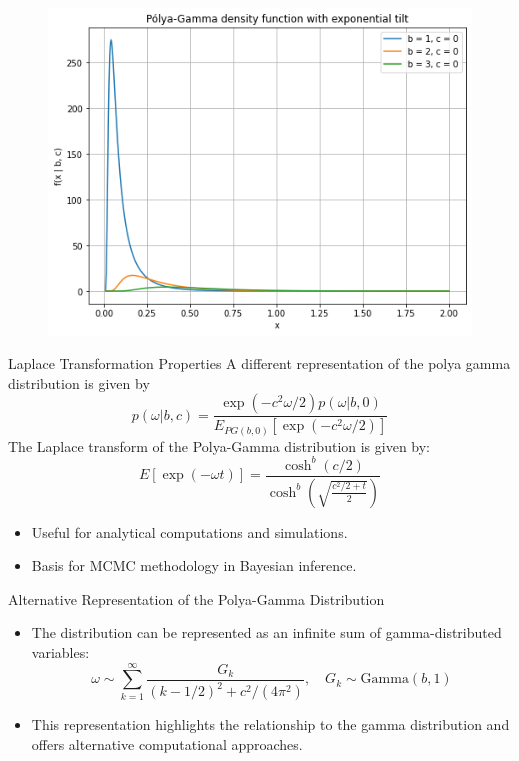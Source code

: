 \documentclass{beamer}
\begin{document}
	\begin{frame}
		\begin{figure}
			\centering
			\includegraphics[width=0.95\linewidth]{polya_b1c0}
			\label{fig:polyab1c0}
		\end{figure}
	\end{frame}
	
	
	\begin{frame}{Laplace Transformation Properties}
		A different representation of the polya gamma distribution is given by
				\begin{equation}
			p(\omega | b, c) = \frac{\exp(-c^2 \omega /2) p(\omega | b, 0)}{E_{PG(b,0)}[\exp(-c^2 \omega /2)]}
		\end{equation}
		The Laplace transform of the Polya-Gamma distribution is given by:
		\begin{equation}
			E[\exp(-\omega t)] =\frac{ \cosh^{b}(c/2)}{\cosh^{b}(\sqrt{\frac{c^2/2+t}{2}})}
		\end{equation}
		\begin{itemize}
			\item Useful for analytical computations and simulations.
			\item Basis for MCMC methodology in Bayesian inference.
		\end{itemize}
	\end{frame}
	




	\begin{frame}{Alternative Representation of the Polya-Gamma Distribution}
		\begin{itemize}
			\item The distribution can be represented as an infinite sum of gamma-distributed variables:
			\begin{equation}
				\omega \sim \sum_{k=1}^{\infty} \frac{G_k}{(k - 1/2)^2 + c^2/(4  \pi^2)}, \quad G_k \sim \text{Gamma}(b,1)
			\end{equation}
			\item This representation highlights the relationship to the gamma distribution and offers alternative computational approaches.
		\end{itemize}
	\end{frame}
	
\end{document}
